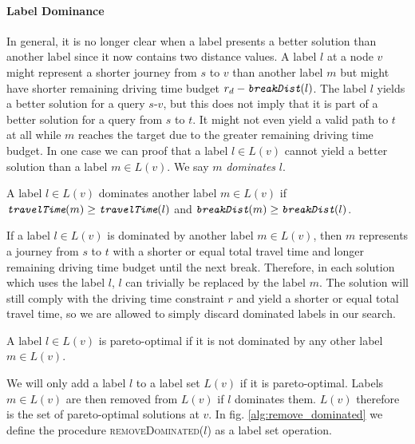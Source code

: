 \paragraph{Label Dominance}
In general, it is no longer clear when a label presents a better solution than another label since it now contains two distance values. A label $l$ at a node $v$ might represent a shorter journey from $s$ to $v$ than another label $m$ but might have shorter remaining driving time budget $r_d - \texttt{\itshape breakDist}(l)$. The label $l$ yields a better solution for a query $s$-$v$, but this does not imply that it is part of a better solution for a query from $s$ to $t$. It might not even yield a valid path to $t$ at all while $m$ reaches the target due to the greater remaining driving time budget. In one case we can proof that a label $l \in L(v)$ cannot yield a better solution than a label $m \in L(v)$. We say $m$ \emph{dominates} $l$.

\begin{definition}
	A label $l \in L(v)$ dominates another label $m \in L(v)$ if $\texttt{\itshape travelTime}(m) \ge \texttt{\itshape travelTime}(l)$ and $\texttt{\itshape breakDist}(m) \ge \texttt{\itshape breakDist}(l)$.
\end{definition}

If a label $l \in L(v)$ is dominated by another label $m \in L(v)$, then $m$ represents a journey from $s$ to $t$ with a shorter or equal total travel time and longer remaining driving time budget until the next break. Therefore, in each solution which uses the label $l$, $l$ can trivially be replaced by the label $m$. The solution will still comply with the driving time constraint $r$ and yield a shorter or equal total travel time, so we are allowed to simply discard dominated labels in our search.

\begin{definition}
	A label $l \in L(v)$ is pareto-optimal if it is not dominated by any other label $m \in L(v)$.
\end{definition}

We will only add a label $l$ to a label set $L(v)$ if it is pareto-optimal. Labels $m \in L(v)$ are then removed from $L(v)$ if $l$ dominates them. $L(v)$ therefore is the set of pareto-optimal solutions at $v$. In fig. \ref{alg:remove_dominated} we define the procedure \textsc{removeDominated($l$)} as a label set operation.

